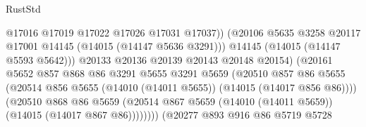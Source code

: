 \begin{lexlean}{RustStd}
\begin{coremodule}
                                            @17016
                                            @17019
                                            @17022
                                            @17026
                                            @17031
                                            @17037))
                                        (@20106
                                          @5635
                                          @3258
                                          @20117
                                          @17001
                                          @14145
                                          (@14015 (@14147 @5636 @3291)))
                                        @14145
                                        (@14015 (@14147 @5593 @5642)))
                                      @20133
                                      @20136
                                      @20139
                                      @20143
                                      @20148
                                      @20154)
                                    (@20161
                                      @5652
                                      @857
                                      @868
                                      @86
                                      @3291
                                      @5655
                                      @3291
                                      @5659
                                      (@20510
                                        @857
                                        @86
                                        @5655
                                        (@20514
                                          @856
                                          @5655
                                          (@14010 (@14011 @5655))
                                          (@14015 (@14017 @856 @86))))
                                      (@20510
                                        @868
                                        @86
                                        @5659
                                        (@20514
                                          @867
                                          @5659
                                          (@14010 (@14011 @5659))
                                          (@14015 (@14017 @867 @86))))))))
                              (@20277
                                @893
                                @916
                                @86
                                @5719
                                @5728

\end{coremodule}
\end{lexlean}
